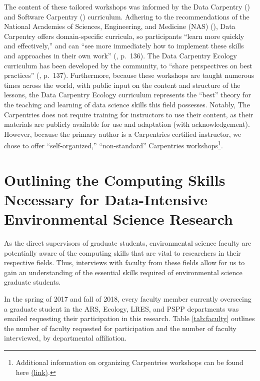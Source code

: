 \documentclass[12pt]{article}
\begin{document}
\quad The content of these tailored workshops was informed by the Data 
Carpentry (\citeyear {data-carpentry}) and Software Carpentry 
(\citeyear{software-carpentry}) curriculum. Adhering to the recommendations of 
the National Academies of Sciences, Engineering, and Medicine (NAS)
(\citeyear{nas}), Data Carpentry offers domain-specific curricula, so
participants ``learn more quickly and effectively,'' and can ``see more
immediately how to implement these skills and approaches in their own work''
(\citeyear{carpentry}, p.\ 136). The Data Carpentry Ecology curriculum has been
developed by the community, to ``share perspectives on best practices''
(\citeyear{carpentry}, p.\ 137). Furthermore, because these workshops are taught
numerous times across the world, with public input on the content and structure
of the lessons, the Data Carpentry Ecology curriculum represents the ``best''
theory for the teaching and learning of data science skills this field
possesses. Notably, The Carpentries does not require training for instructors
to use their content, as their materials are publicly available for use and
adaptation (with acknowledgement). However, because the primary author is a
Carpentries certified instructor, we chose to offer ``self-organized,''
``non-standard'' Carpentries workshops\footnote{Additional information on
organizing Carpentries workshops can be found here 
\href{https://bit.ly/carpentriesorganize}{(link)}.}. 

\section{Outlining the Computing Skills Necessary for Data-Intensive 
Environmental Science Research}
\label{sec:faculty}

\noindent As the direct supervisors of graduate students, environmental science
faculty are potentially aware of the computing skills that are vital to
researchers in their respective fields. Thus, interviews with faculty
from these fields allow for us to gain an understanding of the essential skills
required of environmental science graduate students. 

\quad In the spring of 2017 and fall of 2018, every faculty member
currently overseeing a graduate student in the ARS, Ecology, LRES, and PSPP
departments was emailed requesting their participation in this research. 
Table \ref{tab:faculty} outlines the number of faculty requested for
participation and the number of faculty interviewed, by departmental
affiliation. 
\end{document}
